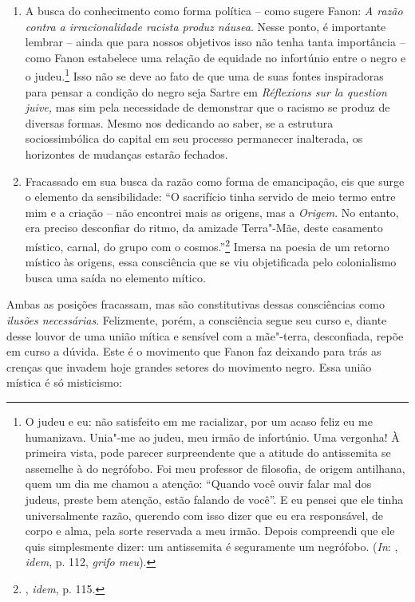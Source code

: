 \begin{enumerate}[label=\alph*)]
\item
A busca do conhecimento como forma política -- como sugere
Fanon: \emph{A razão contra a irracionalidade racista produz náusea}.
Nesse ponto, é importante lembrar -- ainda que para nossos objetivos isso
não tenha tanta importância -- como Fanon estabelece uma relação de
equidade no infortúnio entre o negro e o judeu.\footnote{O judeu e eu:
  não satisfeito em me racializar, por um acaso feliz eu me humanizava.
  Unia"-me ao judeu, meu irmão de infortúnio. Uma vergonha! À primeira
  vista, pode parecer surpreendente que a atitude do antissemita se
  assemelhe à do negrófobo. Foi meu professor de filosofia, de origem
  antilhana, quem um dia me chamou a atenção: ``Quando você ouvir falar
  mal dos judeus, preste bem atenção, estão falando de você''. E eu
  pensei que ele tinha universalmente razão, querendo com isso dizer que
  eu era responsável, de corpo e alma, pela sorte reservada a meu irmão.
  Depois compreendi que ele quis simplesmente dizer: um antissemita é
  seguramente um negrófobo. (\emph{In}: , \emph{idem}, p. 112, \emph{grifo meu}).}
Isso não se deve ao fato de que uma de suas fontes inspiradoras para
pensar a condição do negro seja Sartre em \emph{Réflexions sur la
question juive,} mas sim pela necessidade de demonstrar que o racismo se
produz de diversas formas. Mesmo nos dedicando ao saber, se a estrutura
sociossimbólica do capital em seu processo permanecer inalterada, os
horizontes de mudanças estarão fechados.
\item
Fracassado em sua busca da razão como forma de emancipação,
eis que surge o elemento da sensibilidade: ``O sacrifício tinha servido
de meio termo entre mim e a criação -- não encontrei mais as origens,
mas a \emph{Origem}. No entanto, era preciso desconfiar do ritmo, da
amizade Terra"-Mãe, deste casamento místico, carnal, do grupo com o
cosmos.''\footnote{, \emph{idem}, p. 115.} Imersa na poesia de um retorno
místico às origens, essa consciência que se viu objetificada pelo
colonialismo busca uma saída no elemento mítico.
\end{enumerate}

Ambas as posições fracassam, mas são constitutivas dessas consciências
como \emph{ilusões necessárias}. Felizmente, porém, a consciência segue
seu curso e, diante desse louvor de uma união mítica e sensível com a
mãe"-terra, desconfiada, repõe em curso a dúvida. Este é o movimento que
Fanon faz deixando para trás as crenças que invadem hoje grandes setores
do movimento negro. Essa união mística é só misticismo:

